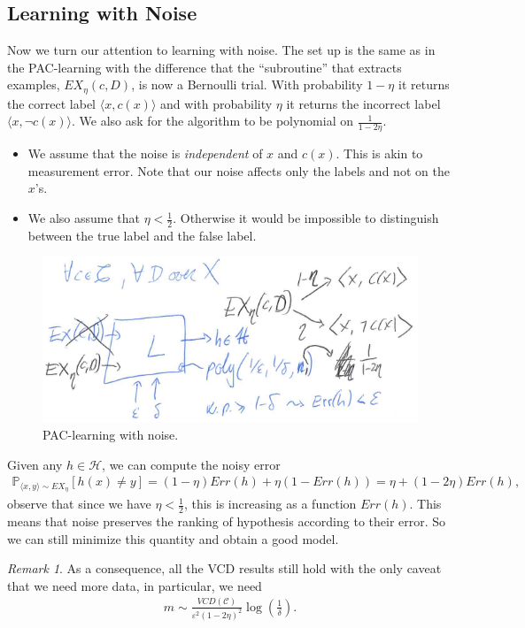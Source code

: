 \documentclass[12pt, letterpaper]{article}
\numberwithin{equation}{section} %
\newcommand{\mb}{\mathbb}
\newcommand{\mc}{\mathcal}
\newcommand{\ve}{\varepsilon}
\theoremstyle{definition}
\theoremstyle{remark}
\newtheorem{remark}[theorem]{Remark}
\begin{document}
\subsection{Learning with Noise}
Now we turn our attention to learning with noise. The set up is the same as in the PAC-learning with the difference that the ``subroutine'' that extracts examples, $EX_\eta(c,D)$, is now a Bernoulli trial. With probability $1-\eta$ it returns the correct label $\langle x, c(x) \rangle$ and with probability $\eta$ it returns the incorrect label $\langle x, \lnot c(x) \rangle$. We also ask for the algorithm to be polynomial on $\frac1{1-2\eta}$.
\begin{itemize}
\item We assume that the noise is \emph{independent} of $x$ and $c(x)$. This is akin to measurement error. Note that our noise affects only the labels and not on the $x$'s.
\item We also assume that $\eta < \frac12$. Otherwise it would be impossible to distinguish between the true label and the false label.
\end{itemize}
\begin{figure}[H]
\centering
\includegraphics[width=0.6\linewidth]{img/noise-pac.png}
\caption{PAC-learning with noise.}
\end{figure}

Given any $h\in \mc H$, we can compute the noisy error
\begin{align}
\mb P_{\langle x, y\rangle \sim EX_\eta}[h(x)\ne y] = (1-\eta)Err(h) + \eta(1-Err(h)) = \eta + (1-2\eta)Err(h),
\end{align}
observe that since we have $\eta < \frac12$, this is increasing as a function $Err(h)$. This means that noise preserves the ranking of hypothesis according to their error. So we can still minimize this quantity and obtain a good model.
\begin{remark}
As a consequence, all the VCD results still hold with the only caveat that we need more data, in particular, we need 
\begin{align}
m \sim \frac{VCD(\mc C)}{\ve^2(1-2\eta)^2}\log\left(\frac1\delta\right).
\end{align}
\end{remark}
\end{document}
